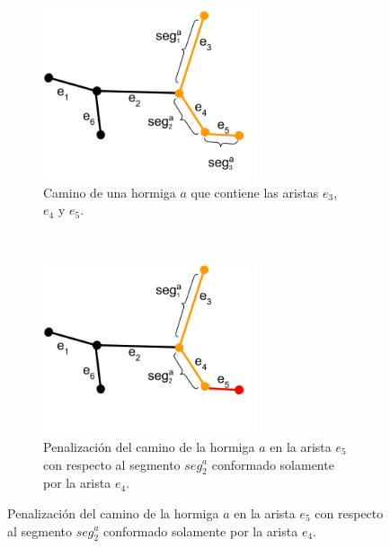 \clearpage




 \begin{figure}[t]
    \centering
    \begin{subfigure}[t]{0.48\textwidth}
        \centering
        \includegraphics[height=2in]{imagenes/ant_segments_complex_case_B1.png}
        \caption{Camino de una hormiga $a$ que contiene las aristas $e_3$, $e_4$ y $e_5$.}
        \label{fig:segmentComplexCaseB1}
    \end{subfigure}%
    ~ \hspace{0.5cm}
    \begin{subfigure}[t]{0.48\textwidth}
        \centering
        \includegraphics[height=2in]{imagenes/ant_segments_complex_case_B2.png}
        \caption{Penalizaci\'on del camino de la hormiga $a$ en la arista $e_5$ con respecto al segmento $seg^{a}_2$ conformado solamente por la arista $e_4$.}
        \label{fig:segmentComplexCaseB2}
    \end{subfigure}


\end{figure}
